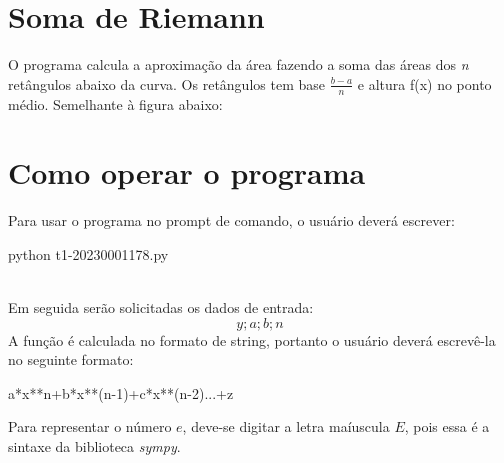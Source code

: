 \documentclass{article}
\begin{document}
	\section{Soma de Riemann}
	O programa calcula a aproximação da área fazendo a soma das áreas dos \textit{n} retângulos abaixo da curva. Os retângulos tem base $\frac{b-a}{n}$ e altura f(x) no ponto médio. Semelhante à figura abaixo:\\

	\begin{center}
			\end{center}
	\section{Como operar o programa}
	Para usar o programa no prompt de comando, o usuário deverá escrever:
	\begin{mylist}
python t1-20230001178.py
	\end{mylist}\\
	Em seguida serão solicitadas os dados de entrada:
	$$y;a;b;n$$
	A função é calculada no formato de string, portanto o usuário deverá escrevê-la no seguinte formato:
	\begin{mylist}
a*x**n+b*x**(n-1)+c*x**(n-2)...+z
	\end{mylist}
	Para representar o número $e$, deve-se digitar a letra maíuscula $E$, pois essa é a sintaxe da biblioteca \textit{sympy}.
\end{document}
